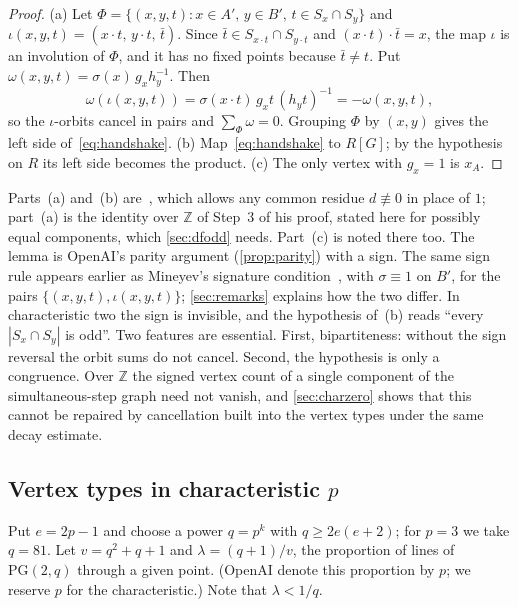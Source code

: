 \documentclass[11pt]{article}
\theoremstyle{definition}
\theoremstyle{plain}
\newcommand{\Z}{\mathbb{Z}}
\newcommand{\PG}{\mathrm{PG}}
\begin{document}
\begin{proof}
(a) Let $\Phi=\{(x,y,t):x\in A',\,y\in B',\,t\in S_x\cap S_y\}$ and $\iota(x,y,t)=(x\cdot t,\,y\cdot t,\,\bar t)$. Since $\bar t\in S_{x\cdot t}\cap S_{y\cdot t}$ and $(x\cdot t)\cdot\bar t=x$, the map $\iota$ is an involution of $\Phi$, and it has no fixed points because $\bar t\neq t$. Put $\omega(x,y,t)=\sigma(x)\,g_xh_y^{-1}$. Then
\[
\omega(\iota(x,y,t))=\sigma(x\cdot t)\,g_xt\,(h_yt)^{-1}=-\omega(x,y,t),
\]
so the $\iota$-orbits cancel in pairs and $\sum_\Phi\omega=0$. Grouping $\Phi$ by $(x,y)$ gives the left side of~\eqref{eq:handshake}. (b) Map~\eqref{eq:handshake} to $R[G]$; by the hypothesis on $R$ its left side becomes the product. (c) The only vertex with $g_x=1$ is $x_A$.
\end{proof}

Parts~(a) and~(b) are~\cite[Lemma~2.2]{Ivanov2026}, which allows any common residue $d\not\equiv0$ in place of $1$; part~(a) is the identity over $\Z$ of Step~3 of his proof, stated here for possibly equal components, which \cref{sec:dfodd} needs. Part~(c) is noted there too. The lemma is OpenAI's parity argument (\cref{prop:parity}) with a sign. The same sign rule appears earlier as Mineyev's signature condition~\cite[\S2.2]{Mineyev2024}, with $\sigma\equiv1$ on $B'$, for the pairs $\{(x,y,t),\iota(x,y,t)\}$; \cref{sec:remarks} explains how the two differ. In characteristic two the sign is invisible, and the hypothesis of~(b) reads ``every $|S_x\cap S_y|$ is odd''. Two features are essential. First, bipartiteness: without the sign reversal the orbit sums do not cancel. Second, the hypothesis is only a congruence. Over $\Z$ the signed vertex count of a single component of the simultaneous-step graph need not vanish, and \cref{sec:charzero} shows that this cannot be repaired by cancellation built into the vertex types under the same decay estimate.

\subsection{Vertex types in characteristic \texorpdfstring{$p$}{p}}

Put $e=2p-1$ and choose a power $q=p^k$ with $q\ge 2e(e+2)$; for $p=3$ we take $q=81$. Let $v=q^2+q+1$ and $\lambda=(q+1)/v$, the proportion of lines of $\PG(2,q)$ through a given point. (OpenAI denote this proportion by $p$; we reserve $p$ for the characteristic.) Note that $\lambda<1/q$.
\end{document}
